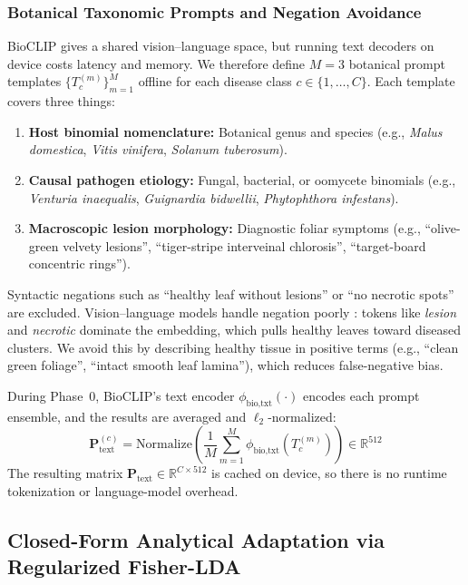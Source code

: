 \documentclass[preprint,12pt]{elsarticle}
\begin{document}
\subsubsection{Botanical Taxonomic Prompts and Negation Avoidance}
BioCLIP gives a shared vision--language space, but running text decoders on device costs latency and memory. We therefore define $M = 3$ botanical prompt templates $\{T_c^{(m)}\}_{m=1}^M$ offline for each disease class $c \in \{1, \dots, C\}$. Each template covers three things:
\begin{enumerate}
    \item \textbf{Host binomial nomenclature:} Botanical genus and species (e.g., \textit{Malus domestica}, \textit{Vitis vinifera}, \textit{Solanum tuberosum}).
    \item \textbf{Causal pathogen etiology:} Fungal, bacterial, or oomycete binomials (e.g., \textit{Venturia inaequalis}, \textit{Guignardia bidwellii}, \textit{Phytophthora infestans}).
    \item \textbf{Macroscopic lesion morphology:} Diagnostic foliar symptoms (e.g., ``olive-green velvety lesions'', ``tiger-stripe interveinal chlorosis'', ``target-board concentric rings'').
\end{enumerate}
Syntactic negations such as ``healthy leaf without lesions'' or ``no necrotic spots'' are excluded. Vision--language models handle negation poorly \cite{radford2021clip, yuksekgonul2023when, alhamoud2025vision}: tokens like \textit{lesion} and \textit{necrotic} dominate the embedding, which pulls healthy leaves toward diseased clusters. We avoid this by describing healthy tissue in positive terms (e.g., ``clean green foliage'', ``intact smooth leaf lamina''), which reduces false-negative bias.

During Phase~0, BioCLIP's text encoder $\phi_{\text{bio,txt}}(\cdot)$ encodes each prompt ensemble, and the results are averaged and $\ell_2$-normalized:
\begin{equation}
    \mathbf{P}_{\text{text}}^{(c)} = \text{Normalize}\left(\frac{1}{M}\sum_{m=1}^M \phi_{\text{bio,txt}}(T_c^{(m)})\right) \in \mathbb{R}^{512}
\end{equation}
The resulting matrix $\mathbf{P}_{\text{text}} \in \mathbb{R}^{C \times 512}$ is cached on device, so there is no runtime tokenization or language-model overhead.

\subsection{Closed-Form Analytical Adaptation via Regularized Fisher-LDA}
\label{sec:fisher_adaptation}
\end{document}

